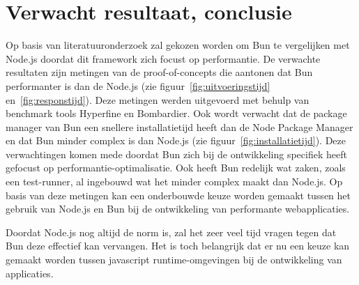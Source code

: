 \section{Verwacht resultaat, conclusie}%
\label{sec:verwachte_resultaten}
Op basis van literatuuronderzoek zal gekozen worden om Bun te vergelijken met Node.js doordat dit framework zich focust op performantie.
De verwachte resultaten zijn metingen van de proof-of-concepts die aantonen dat Bun performanter is dan de Node.js (zie figuur~\ref{fig:uitvoeringstijd} en~\ref{fig:responstijd}). 
Deze metingen werden uitgevoerd met behulp van benchmark tools Hyperfine en Bombardier.
Ook wordt verwacht dat de package manager van Bun een snellere installatietijd heeft dan de Node Package Manager en dat Bun minder complex is dan Node.js (zie figuur~\ref{fig:installatietijd}).
Deze verwachtingen komen mede doordat Bun zich bij de ontwikkeling specifiek heeft gefocust op performantie-optimalisatie.
Ook heeft Bun redelijk wat zaken, zoals een test-runner, al ingebouwd wat het minder complex maakt dan Node.js.
Op basis van deze metingen kan een onderbouwde keuze worden gemaakt tussen het gebruik van Node.js en Bun bij de ontwikkeling
van performante webapplicaties.

Doordat Node.js nog altijd de norm is, zal het zeer veel tijd vragen tegen dat Bun deze effectief kan vervangen.
Het is toch belangrijk dat er nu een keuze kan gemaakt worden tussen javascript runtime-omgevingen bij de ontwikkeling van applicaties.

